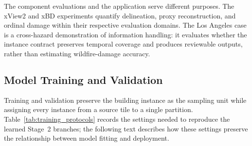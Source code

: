 The component evaluations and the application serve different purposes. The xView2 and xBD experiments quantify delineation, proxy reconstruction, and ordinal damage within their respective evaluation domains. The Los Angeles case is a cross-hazard demonstration of information handling: it evaluates whether the instance contract preserves temporal coverage and produces reviewable outputs, rather than estimating wildfire-damage accuracy.

\subsection{Model Training and Validation}
\label{sec:exp_training}

Training and validation preserve the building instance as the sampling unit while assigning every instance from a source tile to a single partition. Table~\ref{tab:training_protocols} records the settings needed to reproduce the learned Stage~2 branches; the following text describes how these settings preserve the relationship between model fitting and deployment.


